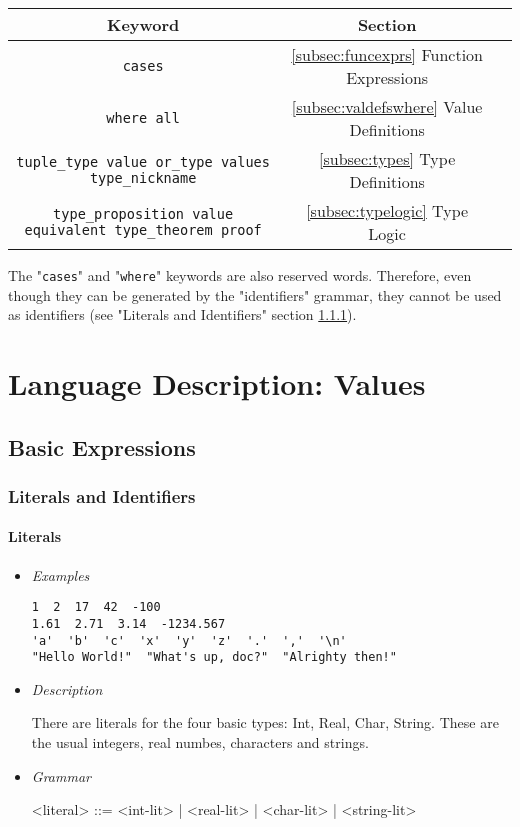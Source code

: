 \documentclass{article}
\begin{document}
\begin{center}
\begin{tabular}{ |c|c|c| } 
\hline
Keyword & Section \\ 
\hline
\hline
\texttt{cases} & \ref{subsec:funcexprs} Function Expressions \\
\hline
\texttt{where all} & \ref{subsec:valdefswhere} Value Definitions \\
\hline
\texttt{tuple_type value or_type values type_nickname} &
\ref{subsec:types} Type Definitions \\
\hline
\texttt{type_proposition value equivalent type_theorem proof} &
{\ref{subsec:typelogic} Type Logic} \\
\hline
\end{tabular}
\end{center}
The "\texttt{cases}" and "\texttt{where}" keywords are also
reserved words. Therefore, even though they can be generated by the
"identifiers" grammar, they cannot be used as identifiers (see "Literals and
Identifiers" section \ref{subsubsec:litsandidents}).

\newpage
\section{Language Description: Values}

\subsection{Basic Expressions}

\subsubsection{Literals and Identifiers}
\label{subsubsec:litsandidents}

\paragraph{Literals}
\begin{itemize}

\item \textit{Examples}
\begin{verbatim}
1  2  17  42  -100
1.61  2.71  3.14  -1234.567
'a'  'b'  'c'  'x'  'y'  'z'  '.'  ','  '\n'
"Hello World!"  "What's up, doc?"  "Alrighty then!"
\end{verbatim}

\item \textit{Description}

There are literals for the four basic types: Int, Real, Char, String. These are the 
usual integers, real numbes, characters and strings.

\item \textit{Grammar}
\begin{grammar}
<literal> ::= <int-lit> | <real-lit> | <char-lit> | <string-lit>
\end{grammar}

\end{itemize}
\end{document}
